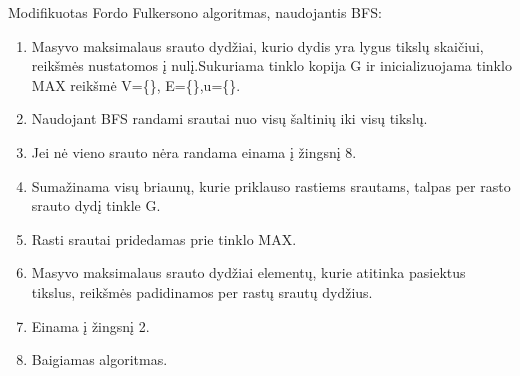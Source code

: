 Modifikuotas Fordo Fulkersono algoritmas, naudojantis BFS:
\begin{enumerate}
	\item Masyvo maksimalaus srauto dydžiai, kurio dydis yra lygus tikslų skaičiui, reikšmės nustatomos į nulį.Sukuriama tinklo kopija G ir inicializuojama tinklo MAX reikšmė {V=\{\}, E=\{\},u=\{\}}.
	\item Naudojant BFS randami srautai nuo visų šaltinių iki visų tikslų.
	\item Jei nė vieno srauto nėra randama einama į žingsnį 8.
	\item Sumažinama visų briaunų, kurie priklauso rastiems srautams, talpas per rasto srauto dydį tinkle G.
	\item Rasti srautai pridedamas prie tinklo MAX.
	\item Masyvo maksimalaus srauto dydžiai elementų, kurie atitinka pasiektus tikslus, reikšmės padidinamos per rastų srautų dydžius.
	\item Einama į žingsnį 2.
	\item Baigiamas algoritmas.
\end{enumerate}
